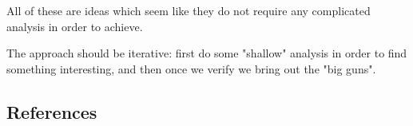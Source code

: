 \documentclass[a4paper, 12pt]{article}
\begin{document}
All of these are ideas which seem like they do not require any complicated analysis in order to achieve.

The approach should be iterative: first do some "shallow" analysis in order to find something interesting, and then once we verify we bring out the "big guns".

\subsection{References}
\label{literature}



\renewcommand\refname{}
\vspace{-50px}




%
\end{document}
